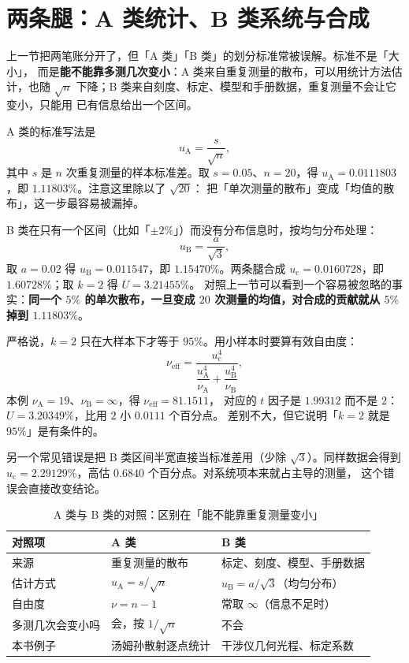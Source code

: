 \section{两条腿：A 类统计、B 类系统与合成}
\label{sec:app-au-class}

上一节把两笔账分开了，但「A 类」「B 类」的划分标准常被误解。标准不是「大小」，
而是\textbf{能不能靠多测几次变小}：A 类来自重复测量的散布，可以用统计方法估计，也随
$\sqrt{n}$ 下降；B 类来自刻度、标定、模型和手册数据，重复测量不会让它变小，只能用
已有信息给出一个区间。

A 类的标准写法是
\begin{equation}
u_\mathrm{A}=\frac{s}{\sqrt{n}},
\label{eq:app-au-uA}
\end{equation}
其中 $s$ 是 $n$ 次重复测量的样本标准差。取 $s=0.05$、$n=20$，得
$u_\mathrm{A}=0.0111803$，即 $1.11803\%$。注意这里除以了 $\sqrt{20}$：
把「单次测量的散布」变成「均值的散布」，这一步最容易被漏掉。

B 类在只有一个区间（比如「$\pm2\%$」）而没有分布信息时，按均匀分布处理：
\begin{equation}
u_\mathrm{B}=\frac{a}{\sqrt{3}},
\label{eq:app-au-uB}
\end{equation}
取 $a=0.02$ 得 $u_\mathrm{B}=0.011547$，即 $1.15470\%$。两条腿合成
$u_\mathrm{c}=0.0160728$，即 $1.60728\%$；取 $k=2$ 得 $U=3.21455\%$。
对照上一节可以看到一个容易被忽略的事实：\textbf{同一个 $5\%$ 的单次散布，一旦变成
$20$ 次测量的均值，对合成的贡献就从 $5\%$ 掉到 $1.11803\%$}。

严格说，$k=2$ 只在大样本下才等于 $95\%$。用小样本时要算有效自由度：
\begin{equation}
\nu_\mathrm{eff}=\frac{u_\mathrm{c}^4}{\dfrac{u_\mathrm{A}^4}{\nu_\mathrm{A}}+\dfrac{u_\mathrm{B}^4}{\nu_\mathrm{B}}},
\label{eq:app-au-nu}
\end{equation}
本例 $\nu_\mathrm{A}=19$、$\nu_\mathrm{B}=\infty$，得 $\nu_\mathrm{eff}=81.1511$，
对应的 $t$ 因子是 $1.99312$ 而不是 $2$：$U=3.20349\%$，比用 $2$ 小 $0.0111$ 个百分点。
差别不大，但它说明「$k=2$ 就是 $95\%$」是有条件的。

另一个常见错误是把 B 类区间半宽直接当标准差用（少除 $\sqrt{3}$）。同样数据会得到
$u_\mathrm{c}=2.29129\%$，高估 $0.6840$ 个百分点。对系统项本来就占主导的测量，
这个错误会直接改变结论。

\begin{table}[htbp]
\centering
\small
\caption{A 类与 B 类的对照：区别在「能不能靠重复测量变小」}
\label{tab:app-au-class}
\begin{tabular}{p{3.4cm}p{5.6cm}p{5.6cm}}
\hline
对照项 & A 类 & B 类 \\
\hline
来源 & 重复测量的散布 & 标定、刻度、模型、手册数据 \\
估计方式 & $u_\mathrm{A}=s/\sqrt{n}$ & $u_\mathrm{B}=a/\sqrt{3}$（均匀分布） \\
自由度 & $\nu=n-1$ & 常取 $\infty$（信息不足时） \\
多测几次会变小吗 & 会，按 $1/\sqrt{n}$ & 不会 \\
本书例子 & 汤姆孙散射逐点统计 & 干涉仪几何光程、标定系数 \\
\hline
\end{tabular}
\end{table}

